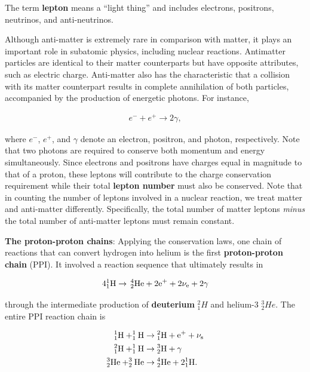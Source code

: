 \documentclass[a4paper,10pt]{article}
\begin{document}
{\noindent}The term \textbf{lepton} means a ``light thing'' and includes electrons, positrons, neutrinos, and anti-neutrinos.

{\noindent}Although anti-matter is extremely rare in comparison with matter, it plays an important role in subatomic physics, including nuclear reactions. Antimatter particles are identical to their matter counterparts but have opposite attributes, such as electric charge. Anti-matter also has the characteristic that a collision with its matter counterpart results in complete annihilation of both particles, accompanied by the production of energetic photons. For instance,

\begin{align*}
    e^- + e^+ \rightarrow 2\gamma,
\end{align*}

{\noindent}where $e^-$, $e^+$, and $\gamma$ denote an electron, positron, and photon, respectively. Note that two photons are required to conserve both momentum and energy simultaneously. Since electrons and positrons have charges equal in magnitude to that of a proton, these leptons will contribute to the charge conservation requirement while their total \textbf{lepton number} must also be conserved. Note that in counting the number of leptons involved in a nuclear reaction, we treat matter and anti-matter differently. Specifically, the total number of matter leptons \textit{minus} the total number of anti-matter leptons must remain constant.

{\noindent}\textbf{The proton-proton chains}: Applying the conservation laws, one chain of reactions that can convert hydrogen into helium is the first \textbf{proton-proton chain} (PPI). It involved a reaction sequence that ultimately results in

\begin{align*}
    {\rm 4^1_1H \rightarrow\,^4_2He + 2e^+ + 2\nu_e + 2\gamma}
\end{align*}

{\noindent}through the intermediate production of \textbf{deuterium} $^2_1H$ and helium-$3$ $^3_2He$. The entire PPI reaction chain is

\begin{align*}
    {\rm ^1_1H + ^1_1H} &\rightarrow {\rm ^2_1H + e^+ + \nu_s} \\
    {\rm ^2_1H + ^1_1H} &\rightarrow {\rm ^3_2H + \gamma} \\
    {\rm ^3_2He + ^3_2He} &\rightarrow {\rm ^4_2He + 2^1_1H}.
\end{align*}
\end{document}
